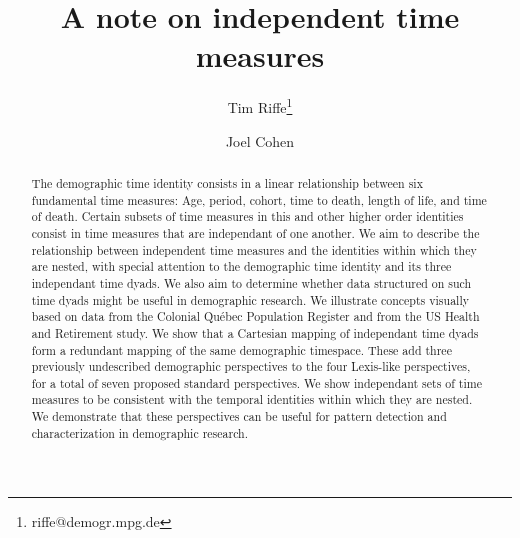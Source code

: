 


\title{A note on independent time measures}

\author[1]{Tim Riffe\thanks{riffe@demogr.mpg.de}}
\author[2]{Joel Cohen}





\maketitle

\vspace{-2em}
\begin{abstract}
 The demographic time identity consists in a linear relationship between six fundamental time measures: Age, period, cohort, time to death, length of life, and time of death. Certain subsets of time measures in this and other higher order identities consist in time measures that are independant of one another.
 We aim to describe the relationship between
independent time measures and the identities within which they are nested, with special attention to the demographic time identity and its three independant time dyads. We also aim to determine whether data structured on such time dyads might be useful in demographic research.
 We illustrate concepts visually based on data from the Colonial Qu\'{e}bec Population Register and from the US Health and Retirement study.
  We show that a Cartesian mapping of independant time dyads form a redundant mapping of the same demographic timespace. These add three previously undescribed demographic perspectives to the four Lexis-like perspectives, for a total of seven proposed standard perspectives. 
 We show independant sets of time measures to be consistent with the temporal identities within which they are nested. We demonstrate that these perspectives can be useful for pattern detection and characterization in demographic research.
\end{abstract}


